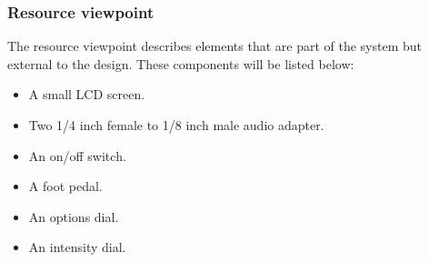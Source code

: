         
    
      
            
            
        
    \subsubsection{Resource viewpoint}
        The resource viewpoint describes elements that are part of the system but external to the design. These components will be listed below:
         \begin{itemize}
            \item A small LCD screen.
            \item Two 1/4 inch female to 1/8 inch male audio adapter.
            \item An on/off switch.
            \item A foot pedal.
            \item An options dial.
            \item An intensity dial.
\end{itemize}
    
